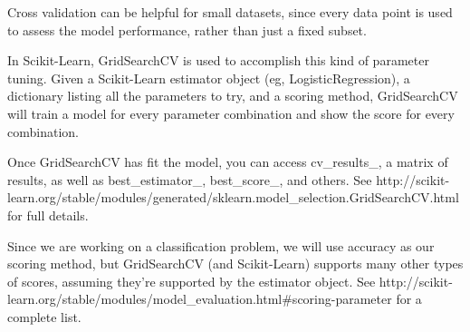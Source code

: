 \documentclass[8pt]{extarticle}
\begin{document}
Cross validation can be helpful for small datasets, since every data
point is used to assess the model performance, rather than just a fixed
subset.

In Scikit-Learn, GridSearchCV is used to accomplish this kind of
parameter tuning. Given a Scikit-Learn estimator object (eg,
LogisticRegression), a dictionary listing all the parameters to try, and
a scoring method, GridSearchCV will train a model for every parameter
combination and show the score for every combination.

Once GridSearchCV has fit the model, you can access cv\_results\_, a
matrix of results, as well as best\_estimator\_, best\_score\_, and
others. See
http://scikit-learn.org/stable/modules/generated/sklearn.model\_selection.GridSearchCV.html
for full details.

Since we are working on a classification problem, we will use accuracy
as our scoring method, but GridSearchCV (and Scikit-Learn) supports many
other types of scores, assuming they're supported by the estimator
object. See
http://scikit-learn.org/stable/modules/model\_evaluation.html\#scoring-parameter
for a complete list.
\end{document}
